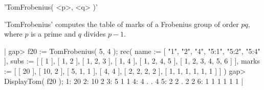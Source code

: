 
'TomFrobenius( <p>, <q> )'

'TomFrobenius' computes the table of marks of a Frobenius  group of order
$p q$, where $p$ is a prime and $q$ divides $p-1$.

|    gap> f20 := TomFrobenius( 5, 4 );
    rec(
      name := [ "1", "2", "4", "5:1", "5:2", "5:4" ],
      subs := [ [ 1 ], [ 1, 2 ], [ 1, 2, 3 ], [ 1, 4 ], [ 1, 2, 4, 5 ], 
          [ 1, 2, 3, 4, 5, 6 ] ],
      marks :=
       [ [ 20 ], [ 10, 2 ], [ 5, 1, 1 ], [ 4, 4 ], [ 2, 2, 2, 2 ],
          [ 1, 1, 1, 1, 1, 1 ] ] )
    gap> DisplayTom( f20 );
    1:  20
    2:  10 2
    3:   5 1 1
    4:   4 . . 4
    5:   2 2 . 2 2
    6:   1 1 1 1 1 1 |


